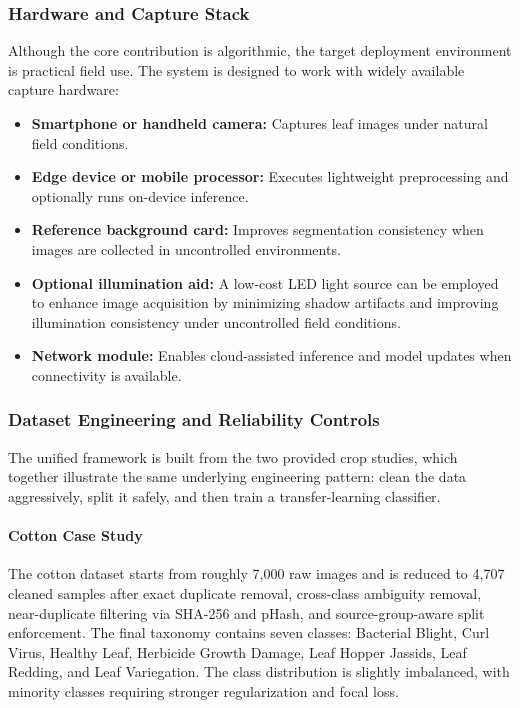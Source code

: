 \documentclass[conference]{IEEEtran}
\begin{document}
\subsubsection{Hardware and Capture Stack}
Although the core contribution is algorithmic, the target deployment environment is practical field use. The system is designed to work with widely available capture hardware:
\begin{itemize}
\item \textbf{Smartphone or handheld camera:} Captures leaf images under natural field conditions.
\item \textbf{Edge device or mobile processor:} Executes lightweight preprocessing and optionally runs on-device inference.
\item \textbf{Reference background card:} Improves segmentation consistency when images are collected in uncontrolled environments.
\item \textbf{Optional illumination aid:} A low-cost LED light source can be employed to enhance image acquisition by minimizing shadow artifacts and improving illumination consistency under uncontrolled field conditions.
\item \textbf{Network module:} Enables cloud-assisted inference and model updates when connectivity is available.
\end{itemize}

\subsubsection{Dataset Engineering and Reliability Controls}
The unified framework is built from the two provided crop studies, which together illustrate the same underlying engineering pattern: clean the data aggressively, split it safely, and then train a transfer-learning classifier.

\paragraph{Cotton Case Study}
The cotton dataset starts from roughly 7,000 raw images and is reduced to 4,707 cleaned samples after exact duplicate removal, cross-class ambiguity removal, near-duplicate filtering via SHA-256 and pHash, and source-group-aware split enforcement. The final taxonomy contains seven classes: Bacterial Blight, Curl Virus, Healthy Leaf, Herbicide Growth Damage, Leaf Hopper Jassids, Leaf Redding, and Leaf Variegation. The class distribution is slightly imbalanced, with minority classes requiring stronger regularization and focal loss.
\end{document}
